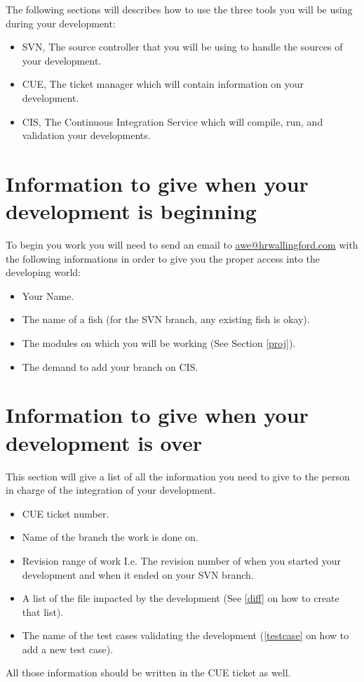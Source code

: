 %
The following sections will describes how to use the three tools you will be
using during your development:
\begin{itemize}
\item SVN, The source controller that you will be using to handle the sources of
your development.
\item CUE, The ticket manager which will contain information on your
development.
\item CIS, The Continuous Integration Service which will compile, run, and
validation your developments.
\end{itemize}
%
\label{mail}
%
\section{Information to give when your development is beginning}
%
To begin you work you will need to send an email to \url{awe@hrwallingford.com}
with the following informations in order to give you the proper access into the
\telemacsystem developing world:
\begin{itemize}
\item Your Name.
\item The name of a fish (for the SVN branch, any existing fish is okay).
\item The \telemacsystem modules on which you will be working (See Section
  \ref{proj}).
\item The demand to add your branch on CIS.
\end{itemize}
%
\section{Information to give when your development is over}
%
This section will give a list of all the information you need to give to the
person in charge of the integration of your development.
%
\begin{itemize}
\item CUE ticket number.
\item Name of the branch the work is done on.
\item Revision range of work I.e. The revision number of when you started your
  development and when it ended on your SVN branch.
\item A list of the file impacted by the development (See \ref{diff} on how to
create that list).
\item The name of the test cases validating the development (\ref{testcase} on
  how to add a new test case).
\end{itemize}

All those information should be written in the CUE ticket as well.
